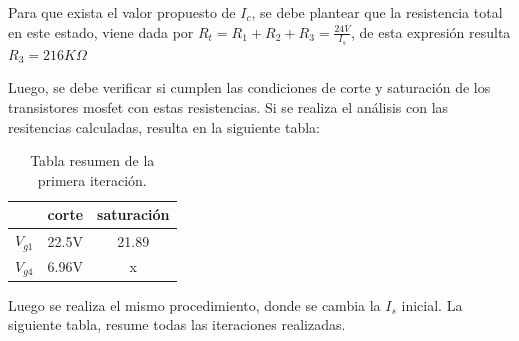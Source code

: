 Para que exista el valor propuesto de $I_c$, se debe plantear que la resistencia total en este estado, viene dada por $R_t=R_1+R_2+R_3 = \frac{24V}{I_s}$, de esta expresión resulta $R_3 = 216K\Omega$

Luego, se debe verificar si cumplen las condiciones de corte y saturación de los transistores mosfet con estas resistencias. Si se realiza el análisis con las resitencias calculadas, resulta en la siguiente tabla: 
\begin{table}[ht!]
\centering
\begin{tabular}{|c|c|c|}
	\hline 
	 & corte & saturación \\ \hline 
	 $V_{g1}$ &22.5V & 21.89 \\ \hline 
	 $V_{g4}$ &6.96V & x \\ \hline 
\end{tabular}
\caption{Tabla resumen de la primera iteración.}
\end{table} 

Luego se realiza el mismo procedimiento, donde se cambia la $I_s$ inicial. La siguiente tabla, resume todas las iteraciones realizadas. 

